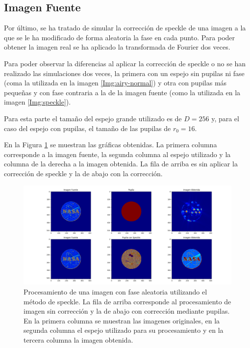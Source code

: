 \documentclass[twoside]{article}
\begin{document}
\begin{multicols}{2}
			\subsection{Imagen Fuente}

				Por último, se ha tratado de simular la corrección de speckle de una imagen a la que se le ha modificado de forma aleatoria la fase en cada punto. Para poder obtener la imagen real se ha aplicado la transformada de Fourier dos veces.

				Para poder observar la diferencias al aplicar la corrección de speckle o no se han realizado las simulaciones dos veces, la primera con un espejo sin pupilas ni fase (coma la utilizada en la imagen \ref{Img:airy-normal}) y otra con pupilas más pequeñas y con fase contraria a la de la imagen fuente (como la utilizada en la imagen \ref{Img:speckle}).

				Para esta parte el tamaño del espejo grande utilizado es de $D = 256$ y, para el caso del espejo con pupilas, el tamaño de las pupilas de $r_0 = 16$.

				En la Figura \ref{Img:nasa} se muestran las gráficas obtenidas. La primera columna corresponde a la imagen fuente, la segunda columna al espejo utilizado y la columna de la derecha a la imagen obtenida. La fila de arriba es sin aplicar la corrección de speckle y la de abajo con la corrección. 

				\end{multicols}
					\begin{figure}[H]
						\centering
						\includegraphics[scale=0.24]{Nasa.png}
						\caption{\label{Img:nasa}Procesamiento de una imagen con fase aleatoria utilizando el método de speckle. La fila de arriba corresponde al procesamiento de imagen sin corrección y la de abajo con corrección mediante pupilas. En la primera columna se muestran las imagenes originales, en la segunda columna el espejo utilizado para su procesamiento y en la tercera columna la imagen obtenida.}
					\end{figure}
\end{document}
